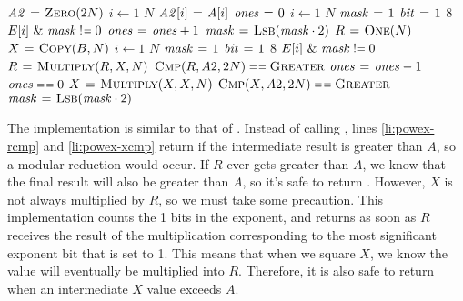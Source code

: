 \documentclass[12pt,twoside]{article}
\newcommand{\isnotequal}{\mathrel{\scalebox{0.8}[1]{!}\hspace*{1pt}\scalebox{0.8}[1]{=}}}
\begin{document}
\begin{problems}
\begin{problemparts}
{  \begin{codebox}
  \li $\id{A2} \gets \proc{Zero}(2N)$ 
  \li \For $i \gets 1$ \To $N$
  \li   \Do
          $\id{A2}[i] \gets \id{A}[i]$
        \End  
  \li $\id{ones} \gets 0$ 
  \li \For $i \gets 1$ \To $N$
  \li   \Do
          $\id{mask} \gets 1$
  \li     \For $\id{bit} \gets 1$ \To $8$ \label{li:exp-for2}
  \li       \Do
              \If $E[i] \textrm{ \& } \id{mask} \isnotequal 0$
  \li         \Then
                $\id{ones} \gets \id{ones} + 1$
              \End
  \li         $\id{mask} \gets \proc{Lsb}(\id{mask} \cdot 2)$
            \End
        \End
  \li $R \mathrel{\hspace{1pt}=\hspace{1pt}} \textnormal{\scshape One}(N)$ 
  \li $X \mathrel{\hspace{1pt}=\hspace{1pt}} \textnormal{\scshape Copy}(B, N)$ 
  \li \For $i \gets 1$ \To $N$
  \li   \Do
          $\id{mask} \gets 1$
  \li     \For $\id{bit} \gets 1$ \To $8$
  \li       \Do
              \If $E[i] \textrm{ \& } \id{mask} \isnotequal 0$
  \li         \Then
                $R \mathrel{\hspace{1pt}=\hspace{1pt}} \textnormal{\scshape Multiply}(R, X, N)$
  \li           \If $\proc{Cmp}(R, A2, 2N) \isequal \const{Greater}$ 
                \label{li:powex-rcmp}
  \li           \Then
                  \Return {}
                \End
  \zi           {}
  \li           $\id{ones} \gets \id{ones} - 1$
  \li           \If $\id{ones} \isequal 0$
  \li           \Then
                  \Return {}  
                \End
              \End
  \li         $X \mathrel{\hspace{1pt}=\hspace{1pt}} \textnormal{\scshape Multiply}(X, X, N)$
  \li         \If $\proc{Cmp}(X, A2, 2N) \isequal \const{Greater}$
              \label{li:powex-xcmp}
  \li         \Then
                \Return {}
              \End
  \li         $\id{mask} \gets \proc{Lsb}(\id{mask} \cdot 2)$
            \End
        \End
  \li \Return {}
  \end{codebox}
  
  The  implementation is similar to that of .
  Instead of calling , lines \ref{li:powex-rcmp} and
  \ref{li:powex-xcmp} return  if the intermediate result is greater
  than $A$, so a modular reduction would occur. If $R$ ever gets greater than
  $A$, we know that the final result will also be greater than $A$, so it's safe
  to return . However, $X$ is not always multiplied by $R$, so we
  must take some precaution. This implementation counts the 1 bits in the
  exponent, and returns as soon as $R$ receives the result of the multiplication
  corresponding to the most significant exponent bit that is set to 1. This
  means that when we square $X$, we know the value will eventually be multiplied
  into $R$. Therefore, it is also safe to return  when an
  intermediate $X$ value exceeds $A$.
  
}
\end{problemparts}
\end{problems}
\end{document}
